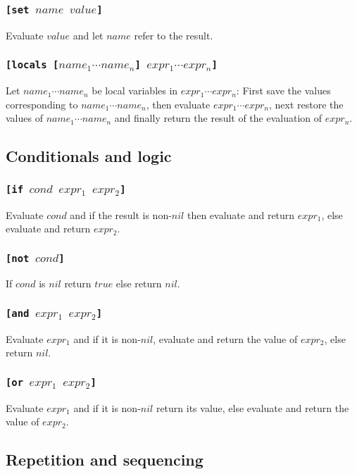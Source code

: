\subsubsection{\tt{[set }$name$ $value$\tt{]}}
Evaluate $value$ and let $name$ refer to the result.

\subsubsection{\tt{[locals [}$name_1 \cdots name_n$\tt{]} $expr_1 \cdots expr_n$\tt{]}}
Let $name_1 \cdots name_n$ be local variables in $expr_1 \cdots expr_n$: First save the values corresponding to $name_1 \cdots name_n$, then evaluate $expr_1 \cdots expr_n$, next restore the values of $name_1 \cdots name_n$ and finally return the result of the evaluation of $expr_n$.

\subsection{Conditionals and logic}
\subsubsection{\tt{[if }$cond$ $expr_1$ $expr_2$\tt{]}}
Evaluate $cond$ and if the result is non-$nil$ then evaluate and return $expr_1$, else evaluate and return $expr_2$.

\subsubsection{\tt{[not }$cond$\tt{]}}
If $cond$ is $nil$ return $true$ else return $nil$.

\subsubsection{\tt{[and }$expr_1$ $expr_2$\tt{]}}
Evaluate $expr_1$ and if it is non-$nil$, evaluate and return the value of $expr_2$, else return $nil$.

\subsubsection{\tt{[or }$expr_1$ $expr_2$\tt{]}}
Evaluate $expr_1$ and if it is non-$nil$ return its value, else evaluate and return the value of $expr_2$.

\subsection{Repetition and sequencing}
